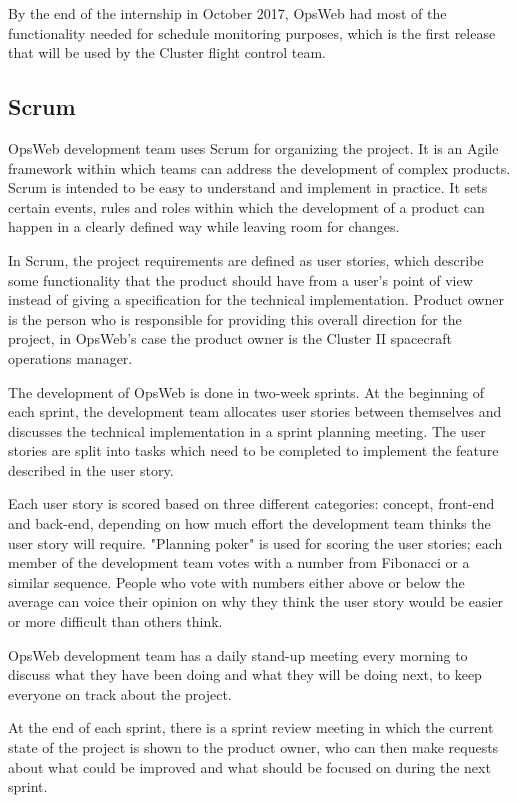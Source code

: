 By the end of the internship in October 2017, OpsWeb had most of the functionality needed for schedule monitoring purposes, which is the first release that will be used by the Cluster flight control team.
\subsection{Scrum}
OpsWeb development team uses Scrum for organizing the project. It is an Agile framework within which teams can address the development of complex products. Scrum is intended to be easy to understand and implement in practice. It sets certain events, rules and roles within which the development of a product can happen in a clearly defined way while leaving room for changes.

In Scrum, the project requirements are defined as user stories, which describe some functionality that the product should have from a user's point of view instead of giving a specification for the technical implementation. Product owner is the person who is responsible for providing this overall direction for the project, in OpsWeb's case the product owner is the Cluster II spacecraft operations manager.

The development of OpsWeb is done in two-week sprints. At the beginning of each sprint, the development team allocates user stories between themselves and discusses the technical implementation in a sprint planning meeting. The user stories are split into tasks which need to be completed to implement the feature described in the user story. 

Each user story is scored based on three different categories: concept, front-end and back-end, depending on how much effort the development team thinks the user story will require. "Planning poker" is used for scoring the user stories; each member of the development team votes with a number from Fibonacci or a similar sequence. People who vote with numbers either above or below the average can voice their opinion on why they think the user story would be easier or more difficult than others think. \cite{grenning2002planning}

OpsWeb development team has a daily stand-up meeting every morning to discuss what they have been doing and what they will be doing next, to keep everyone on track about the project.

At the end of each sprint, there is a sprint review meeting in which the current state of the project is shown to the product owner, who can then make requests about what could be improved and what should be focused on during the next sprint.


